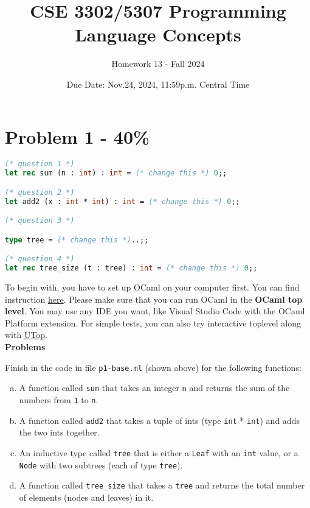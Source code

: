 \documentclass{article}
\begin{document}
\title{CSE 3302/5307 Programming Language Concepts}
\author{Homework 13 - Fall 2024}
\date{Due Date: Nov.24, 2024, 11:59p.m. Central Time}
\maketitle
\thispagestyle{fancy}


\section*{Problem 1 - 40\%}

\begin{lstlisting}[language=OCaml]
(* question 1 *)
let rec sum (n : int) : int = (* change this *) 0;;

(* question 2 *)
let add2 (x : int * int) : int = (* change this *) 0;;

(* question 3 *)

type tree = (* change this *)..;;

(* question 4 *)
let rec tree_size (t : tree) : int = (* change this *) 0;;
\end{lstlisting}

	
	To begin with, you have to set up OCaml on your computer first. You can find instruction  \href{https://ocaml.org/docs/up-and-running}{here}. Please make sure that you can run OCaml in the \textbf{OCaml top level}. You may use any IDE you want, like Visual Studio Code with the OCaml Platform extension. For simple tests, you can also try interactive toplevel along with \href{https://github.com/ocaml-community/utop}{UTop}.
	\\
	
	\textbf{Problems}
	
	Finish in the code in file \texttt{p1-base.ml} (shown above)  for the following functions:
	\begin{enumerate}[a)]
	\item A function called \texttt{sum} that takes an integer \texttt{n} and returns the sum of the numbers from \texttt{1} to \texttt{n}.
	\item A function called \texttt{add2} that takes a tuple of ints (type \texttt{int} * \texttt{int}) and adds the two ints together.
	\item An inductive type called \texttt{tree} that is either a \texttt{Leaf} with an \texttt{int} value, or a \texttt{Node} with two subtrees (each of type \texttt{tree}).
	\item A function called \texttt{tree\_size} that takes a \texttt{tree} and returns the total number of elements (nodes and leaves) in it.
	\end{enumerate}
	
\end{document}
